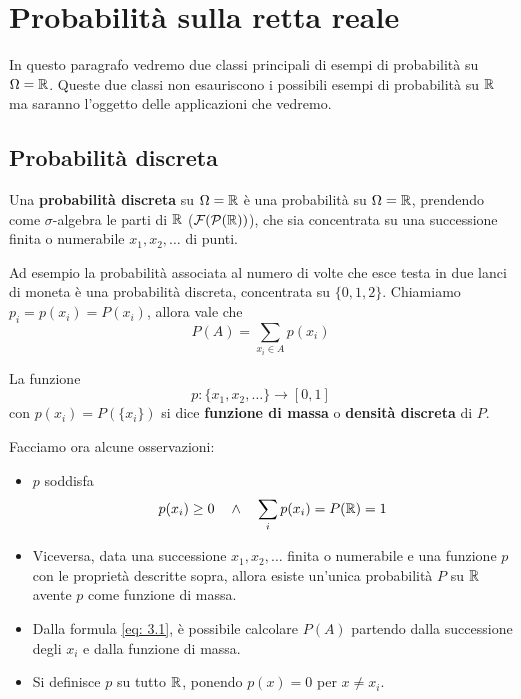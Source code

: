 \section{Probabilità sulla retta reale}
In questo paragrafo vedremo due classi principali di esempi di probabilità su $\Omega = \mathbb{R}$.
Queste due classi non esauriscono i possibili esempi di probabilità su $\mathbb{R}$ ma saranno l'oggetto
delle applicazioni che vedremo.

\subsection{Probabilità discreta}
Una \textbf{probabilità discreta} su $\Omega = \mathbb{R}$ è una probabilità su $\Omega = \mathbb{R}$, prendendo
come $\sigma$-algebra le parti di $\mathbb{R}$ ($\mathcal{F} (\mathcal{P}(\mathbb{R}))$), che sia concentrata su una
successione finita o numerabile $x_1, x_2, \dots$ di punti.

Ad esempio la probabilità associata al numero di volte che esce testa in due lanci di moneta è
una probabilità discreta, concentrata su $\{0,1,2\}$. Chiamiamo $p_i = p(x_i) = P(x_i)$, allora
vale che
\begin{equation}\label{eq: 3.1} P(A) = \sum_{x_i \in A} p(x_i) \end{equation}

\begin{definition}
	La funzione
	\[ p : \{ x_1, x_2, \dots \} \to [0,1] \]
	con $p(x_i) = P(\{x_i\})$ si dice \textbf{funzione di massa} o \textbf{densità discreta} di $P$.
\end{definition}

\begin{observation}
	Facciamo ora alcune osservazioni:
	\begin{itemize}
		\item $p$ soddisfa
		      \[ p(x_i) \geq 0 \quad \land \quad \sum_i p(x_i) = P(\mathbb{R}) = 1\]
		\item Viceversa, data una successione $x_1, x_2, \dots$ finita o numerabile e una funzione
		      $p$ con le proprietà descritte sopra, allora esiste un'unica probabilità $P$ su $\mathbb{R}$
		      avente $p$ come funzione di massa.
		\item Dalla formula \ref{eq: 3.1}, è possibile calcolare $P(A)$ partendo dalla successione
		      degli $x_i$ e dalla funzione di massa.
		\item Si definisce $p$ su tutto $\mathbb{R}$, ponendo $p(x) = 0$ per $x \neq x_i$.
	\end{itemize}
\end{observation}

